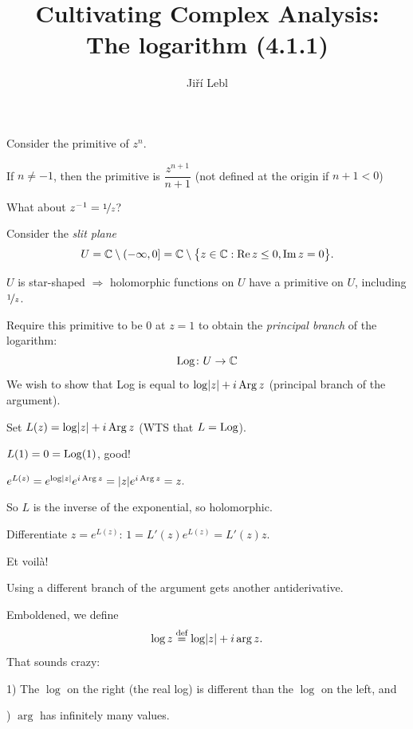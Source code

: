 \documentclass[10pt,aspectratio=169]{beamer}
\author{Ji\v{r}\'i Lebl}
\institute[OSU]{%
Departemento pri Matematiko de Oklahoma {\^S}tata Universitato}
\title{Cultivating Complex Analysis:\\%
The logarithm (4.1.1)}
\date{}
\begin{document}
\begin{frame}
\titlepage
\end{frame}

\begin{frame}
Consider the primitive of $z^n$.

\medskip
\pause

If $n\not=-1$, then the primitive is 
$\dfrac{z^{n+1}}{n+1}$ (not defined at the origin if $n+1 < 0$)

\medskip
\pause

What about $z^{-1} = \nicefrac{1}{z}$?

\medskip
\pause

Consider the \emph{slit plane}
\[
U = {\mathbb{C}} \setminus (-\infty,0] = {\mathbb{C}} \setminus \bigl\{ z \in {\mathbb{C}} : \operatorname{Re} z \leq 0 , \operatorname{Im} z = 0 \bigr\}.
\]

\pause

$U$ is star-shaped $\Rightarrow$ holomorphic functions on $U$ have a primitive on
$U$, including $\nicefrac{1}{z}$.

\medskip
\pause

Require this primitive to be $0$ at $z=1$ to obtain
the \emph{principal branch} of the logarithm:
\[
\operatorname{Log} \colon U \to {\mathbb{C}} 
\]
\pause
We wish to show that Log is equal to
$\log \lvert {z} \rvert + i \operatorname{Arg} z$ (principal branch of the argument).
\end{frame}

\begin{frame}
Set $L(z) = \log \lvert {z} \rvert + i \operatorname{Arg} z$ \qquad (WTS that $L = \operatorname{Log}$).

\medskip
\pause

$L(1) = 0 = \operatorname{Log}(1)$, good!

\medskip
\pause

$
e^{L(z)}
=
e^{\log \lvert {z} \rvert} e^{i \operatorname{Arg} z}
=
\lvert {z} \rvert e^{i \operatorname{Arg} z} = z .
$

\pause
\medskip

So $L$ is the inverse of the exponential, so holomorphic.

\medskip
\pause
Differentiate $z = e^{L(z)}$:
\qquad
\pause
$
1 = L'(z) e^{L(z)} = L'(z) z .
$

\medskip
\pause
Et voil\`a!

\medskip
\pause

Using a different branch of the argument gets another antiderivative.

\medskip
\pause

Emboldened, we define
\[
\log z \overset{\text{def}}{=} \log \lvert {z} \rvert + i \arg z .
\]
\pause
That sounds crazy: \pause

1) The $\log$ on the right (the real log) is different than the $\log$ on
the left, and

) $\arg$ has infinitely many values.
\end{frame}
\end{document}
